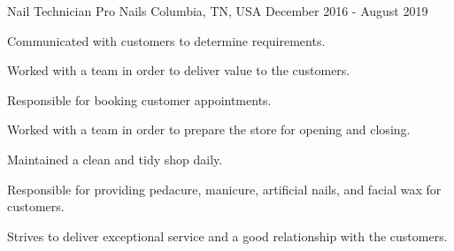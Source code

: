 

\begin{cventries}

  \cventry
    {Nail Technician} %
    {Pro Nails} %
    {Columbia, TN, USA} %
    {December 2016 - August 2019} %
    {
      \begin{cvitems} %
      \item Communicated with customers to determine requirements.
      \item Worked with a team in order to deliver value to the customers.
      \item Responsible for booking customer appointments.
      \item Worked with a team in order to prepare the store for opening and closing.
      \item Maintained a clean and tidy shop daily.
      \item Responsible for providing pedacure, manicure, artificial nails, and facial wax for customers.
      \item Strives to deliver exceptional service and a good relationship with the customers.
      \end{cvitems}
    }


\end{cventries}
